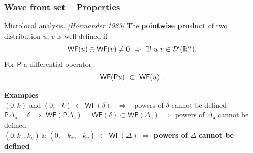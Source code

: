\documentclass[9pt]{beamer}
\newcommand{\WF}{\mathsf{WF}} %
\newcommand{\citebeam}[1]{\textit{\textcolor{black!60!white}{[#1]}}} %
\newcommand{\Psf}{\mathsf{P}}
\newcommand{\asf}{\mathsf{a}}
\begin{document}
\begin{frame}

\frametitle{Wave front set -- Properties}

\vfill

\begin{block}{Microlocal analysis. \citebeam{Hörmander 1983}}
The \textbf{pointwise product} of two distribution $u$, $v$ is well defined if 
\vspace*{-10pt}
\begin{equation*}
\WF(u) \oplus \WF(v) \neq 0 \ \Rightarrow \ \exists! \ u.v \in \mathcal{D}^{\prime}(\mathbb{R}^n). 
\vspace*{-10pt}
\end{equation*}
For $\Psf$ a differential operator
\vspace*{-12pt}
\begin{equation*}
\WF(\Psf u) \ \subset  \ \WF(u) \ .
\vspace*{-8pt}
\end{equation*}
\end{block}

\vfill

\textbf{Examples} \\[4pt]

$(0,k)$ and $(0,-k)$ $\in$ $\WF(\delta)$ \ $\Rightarrow$ \ powers of $\delta$ cannot be defined \\[3pt]
$\Psf \Delta_\asf = \delta$ $\Rightarrow$ $\WF(\Psf \Delta_\asf) = \WF(\delta) \subset \WF(\Delta_\asf)$ $\Rightarrow$ powers of $\Delta_\asf$ cannot be defined \\[8pt]

$(0;k_x,k_y) \ \& \ (0,-k_x,-k_y)$ $\in$ $\WF(\Delta)$ $\Rightarrow$ \textbf{powers of} $\Delta$ \textbf{cannot be defined} \ \textdbend

\vfill

\end{frame} 

\end{document}
